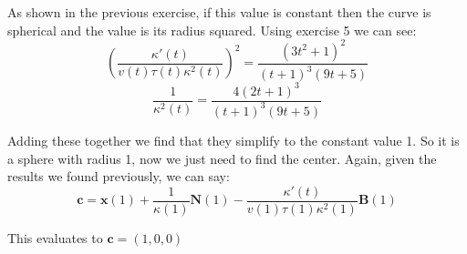 \documentclass{article}
\begin{document}
As shown in the previous exercise, if this value is constant then the curve is spherical and the value is its radius squared. Using exercise 5 we can see:
$$\left(\frac{\kappa'(t)}{v(t)\tau(t)\kappa^2(t)}\right)^2=\frac{(3t^2+1)^2}{(t+1)^3(9t+5)}$$
$$\frac{1}{\kappa^2(t)}=\frac{4(2t+1)^3}{(t+1)^3(9t+5)}$$

Adding these together we find that they simplify to the constant value 1. So it is a sphere with radius 1, now we just need to find the center. Again, given the results we found previously, we can say:
$$\mathbf c=\mathbf x(1)+\frac{1}{\kappa(1)}\mathbf N(1)-\frac{\kappa'(t)}{v(1)\tau(1)\kappa^2(1)}\mathbf B(1)$$

This evaluates to $\mathbf c=(1,0,0)$
\end{document}

